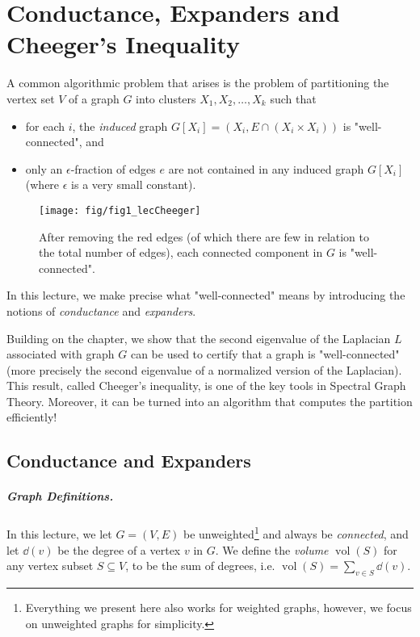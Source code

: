 \newcommand\vol{\operatorname{vol}}

\chapter{Conductance, Expanders and Cheeger's Inequality}
\label{chap:cheegersInequality}
\sloppy

A common algorithmic problem that arises is the problem of partitioning the vertex set $V$ of a graph $G$ into clusters $X_1, X_2, \dots, X_k$ such that 
\begin{itemize}
    \item for each $i$, the \emph{induced} graph $G[X_i] = (X_i, E \cap (X_i \times X_i))$ is "well-connected", and
    \item only an $\epsilon$-fraction of edges $e$ are not contained in any induced graph $G[X_i]$ (where $\epsilon$ is a very small constant).
\end{itemize}

\begin{figure}[!ht]
    \centering
    \texttt{[image: fig/fig1\_lecCheeger]}
    \caption{After removing the red edges (of which there are few in relation to the total number of edges), each connected component in $G$ is "well-connected".}
\end{figure}

In this lecture, we make precise what "well-connected" means by introducing the notions of \emph{conductance} and \emph{expanders}. 

Building on the chapter, we show that the second eigenvalue of the Laplacian $L$ associated with graph $G$ can be used to certify that a graph is "well-connected" (more precisely the second eigenvalue of a normalized version of the Laplacian). This result, called Cheeger's inequality, is one of the key tools in Spectral Graph Theory. Moreover, it can be turned into an algorithm that computes the partition efficiently!

\section{Conductance and Expanders}

\paragraph{Graph Definitions.} In this lecture, we let $G=(V,E)$ be unweighted\footnote{Everything we present here also works for weighted graphs, however, we focus on unweighted graphs for simplicity.} and always be \emph{connected}, and let $\dd(v)$ be the degree of a vertex $v$ in $G$. We define the \emph{volume} $\vol(S)$ for any vertex subset $S \subseteq V$, to be the sum of degrees, i.e. $\vol(S) = \sum_{v \in S} \dd(v)$.

